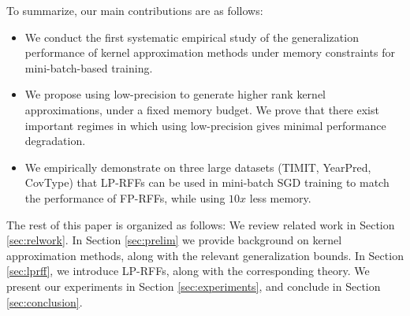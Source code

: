 To summarize, our main contributions are as follows:
\begin{itemize}
	\item We conduct the first systematic empirical study of the generalization performance of kernel approximation methods under memory constraints for mini-batch-based training.
	\item We propose using low-precision to generate higher rank kernel approximations, under a fixed memory budget. We prove that there exist important regimes in which using low-precision gives minimal performance degradation.
	\item We empirically demonstrate on three large datasets (TIMIT, YearPred, CovType) that LP-RFFs can be used in mini-batch SGD training to match the performance of FP-RFFs, while using $10x$ less memory.
\end{itemize}

The rest of this paper is organized as follows: We review related work in Section \ref{sec:relwork}.  In Section \ref{sec:prelim} we provide background on kernel approximation methods, along with the relevant generalization bounds. In Section \ref{sec:lprff}, we introduce LP-RFFs, along with the corresponding theory.  We present our experiments in Section \ref{sec:experiments}, and conclude in Section \ref{sec:conclusion}.


